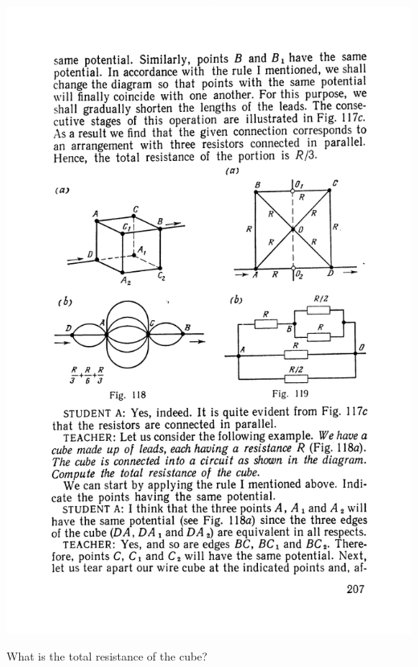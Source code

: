 \documentclass[a4paper,sfsidenotes]{tufte-book}
\begin{document}
\begin{marginfigure}%
\centering
\includegraphics[width=\linewidth]{fig-119a}
\caption{ What is the total resistance of the cube?}
\label{fig-119}
\end{marginfigure}
\end{document}
